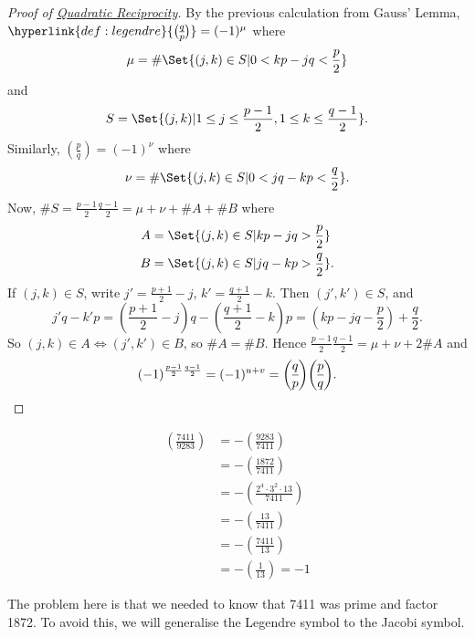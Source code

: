 \documentclass{article}
\newcommand{\legendre}[2]{\genfrac{(}{)}{}{}{#1}{#2}}
\begin{document}
\begin{proof}[Proof of \hyperlink{thm:qr}{Quadratic Reciprocity}]
    By the previous calculation from Gauss' Lemma, $\hyperlink{def:legendre}{\legendre{q}{p}} = (-1)^\mu$
    where
    \begin{equation*}
        \mu =\#\Set{(j, k) \in S | 0 < kp - jq < \frac{p}{2}}
    \end{equation*}
    and
    \begin{equation*}
        S = \Set{(j, k) | 1 \leq j \leq \frac{p-1}{2}, 1 \leq k \leq \frac{q-1}{2}}.
    \end{equation*}
    Similarly, $\legendre{p}{q} = (-1)^\nu$ where
    \begin{equation*}
        \nu =\#\Set{(j, k) \in S | 0 < jq - kp < \frac{q}{2}}.
    \end{equation*}
    Now, $\#S = \frac{p-1}{2} \frac{q-1}{2} = \mu + \nu + \#A + \#B$ where
    \begin{align*}
        A &= \Set{(j, k) \in S | kp - jq > \frac{p}{2}} \\
        B &= \Set{(j, k) \in S | jq - kp > \frac{q}{2}}.
    \end{align*}
    If $(j, k) \in S$, write $j' = \frac{p+1}{2} - j$, $k' = \frac{q+1}{2} - k$.
    Then $(j', k') \in S$, and
    \begin{equation*}
        j'q - k'p = \left(\frac{p+1}{2} - j\right) q - \left(\frac{q+1}{2} - k\right) p = \left(kp - jq - \frac{p}{2}\right) + \frac{q}{2}.
    \end{equation*}
    So $(j, k) \in A \iff (j', k') \in B$, so $\#A = \#B$.
    Hence $\frac{p-1}{2} \frac{q-1}{2} = \mu + \nu + 2 \#A$ and
    \begin{equation*}
        (-1)^{\frac{p-1}{2} \frac{q-1}{2}} = (-1)^{u+v} = \legendre{q}{p} \legendre{p}{q}.\qedhere
    \end{equation*}
\end{proof}

\begin{eg}
    \begin{align*}
        \legendre{7411}{9283} &= -\legendre{9283}{7411} \\
                              &= -\legendre{1872}{7411} \\
                              &= -\legendre{2^4 \cdot 3^2 \cdot 13}{7411} \\
                              &= -\legendre{13}{7411} \\
                              &= -\legendre{7411}{13} \\
                              &= -\legendre{1}{13} = -1
    \end{align*}

    The problem here is that we needed to know that 7411 was prime and factor 1872.
    To avoid this, we will generalise the Legendre symbol to the Jacobi symbol.
\end{eg}
\end{document}
